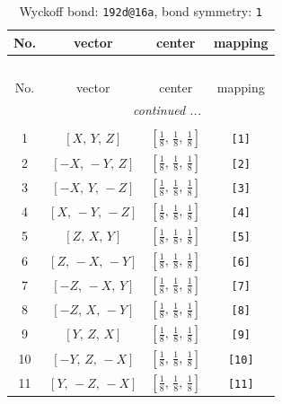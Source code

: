 \documentclass[fleqn,8pt]{jsarticle}
\begin{document}
\begin{longtable}{cccc}
\caption{Wyckoff bond: {\tt 192d@16a}, bond symmetry: {\tt 1}}
 \\
 \hline \hline
No. & vector & center & mapping \\ \hline \endfirsthead

\multicolumn{3}{l}{\tablename\ \thetable{}} \\
 \hline \hline
No. & vector & center & mapping \\ \hline \endhead

 \hline \hline
\multicolumn{3}{r}{\footnotesize\it continued ...} \\ \endfoot

 \hline \hline
\multicolumn{3}{r}{} \\ \endlastfoot

1 & $\left[ X,\, Y,\, Z \right]$ & $\left[ \frac{1}{8},\, \frac{1}{8},\, \frac{1}{8} \right]$ & {\tt [1]} \\ \hline
2 & $\left[ - X,\, - Y,\, Z \right]$ & $\left[ \frac{1}{8},\, \frac{1}{8},\, \frac{1}{8} \right]$ & {\tt [2]} \\ \hline
3 & $\left[ - X,\, Y,\, - Z \right]$ & $\left[ \frac{1}{8},\, \frac{1}{8},\, \frac{1}{8} \right]$ & {\tt [3]} \\ \hline
4 & $\left[ X,\, - Y,\, - Z \right]$ & $\left[ \frac{1}{8},\, \frac{1}{8},\, \frac{1}{8} \right]$ & {\tt [4]} \\ \hline
5 & $\left[ Z,\, X,\, Y \right]$ & $\left[ \frac{1}{8},\, \frac{1}{8},\, \frac{1}{8} \right]$ & {\tt [5]} \\ \hline
6 & $\left[ Z,\, - X,\, - Y \right]$ & $\left[ \frac{1}{8},\, \frac{1}{8},\, \frac{1}{8} \right]$ & {\tt [6]} \\ \hline
7 & $\left[ - Z,\, - X,\, Y \right]$ & $\left[ \frac{1}{8},\, \frac{1}{8},\, \frac{1}{8} \right]$ & {\tt [7]} \\ \hline
8 & $\left[ - Z,\, X,\, - Y \right]$ & $\left[ \frac{1}{8},\, \frac{1}{8},\, \frac{1}{8} \right]$ & {\tt [8]} \\ \hline
9 & $\left[ Y,\, Z,\, X \right]$ & $\left[ \frac{1}{8},\, \frac{1}{8},\, \frac{1}{8} \right]$ & {\tt [9]} \\ \hline
10 & $\left[ - Y,\, Z,\, - X \right]$ & $\left[ \frac{1}{8},\, \frac{1}{8},\, \frac{1}{8} \right]$ & {\tt [10]} \\ \hline
11 & $\left[ Y,\, - Z,\, - X \right]$ & $\left[ \frac{1}{8},\, \frac{1}{8},\, \frac{1}{8} \right]$ & {\tt [11]} \\ \hline

\end{longtable}
\end{document}
